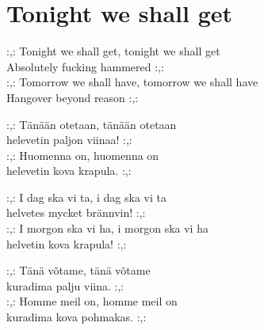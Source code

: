 \section{Tonight we shall get}

:,: Tonight we shall get, tonight we shall get\\
Absolutely fucking hammered :,:\\
:,: Tomorrow we shall have, tomorrow we shall have\\
Hangover beyond reason :,:

:,: Tänään otetaan, tänään otetaan\\
helevetin paljon viinaa! :,:\\
:,: Huomenna on, huomenna on\\
helevetin kova krapula. :,:

:,: I dag ska vi ta, i dag ska vi ta\\
helvetes mycket brännvin! :,:\\
:,: I morgon ska vi ha, i morgon ska vi ha\\
helvetin kova krapula! :,:

:,: Tänä võtame, tänä võtame\\
kuradima palju viina. :,:\\
:,: Homme meil on, homme meil on\\
kuradima kova pohmakas. :,: